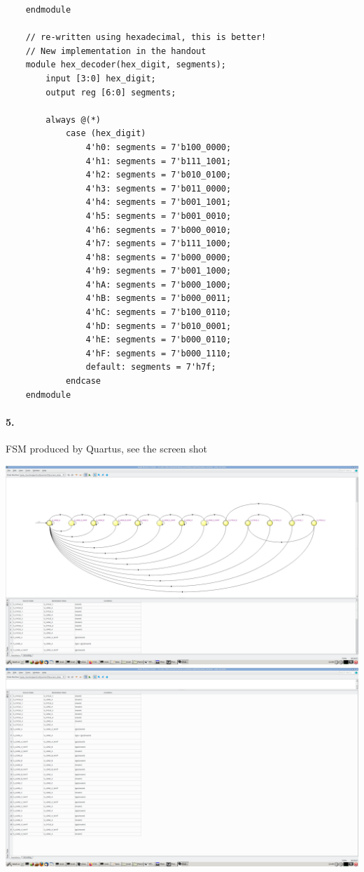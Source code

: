 \documentclass{article}
\begin{document}
\begin{verbatim}
    endmodule

    // re-written using hexadecimal, this is better!
    // New implementation in the handout
    module hex_decoder(hex_digit, segments);
        input [3:0] hex_digit;
        output reg [6:0] segments;
    
        always @(*)
            case (hex_digit)
                4'h0: segments = 7'b100_0000;
                4'h1: segments = 7'b111_1001;
                4'h2: segments = 7'b010_0100;
                4'h3: segments = 7'b011_0000;
                4'h4: segments = 7'b001_1001;
                4'h5: segments = 7'b001_0010;
                4'h6: segments = 7'b000_0010;
                4'h7: segments = 7'b111_1000;
                4'h8: segments = 7'b000_0000;
                4'h9: segments = 7'b001_1000;
                4'hA: segments = 7'b000_1000;
                4'hB: segments = 7'b000_0011;
                4'hC: segments = 7'b100_0110;
                4'hD: segments = 7'b010_0001;
                4'hE: segments = 7'b000_0110;
                4'hF: segments = 7'b000_1110;   
                default: segments = 7'h7f;
            endcase
    endmodule

\end{verbatim}

\paragraph{5.} FSM produced by Quartus, see the screen shot
\begin{center}
    \includegraphics[scale=0.19]{quartus_fsm.png}
    \includegraphics[scale=0.19]{quartus_statetable.png}
\end{center}
\end{document}
